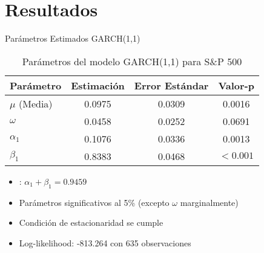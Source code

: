 \section{Resultados}

\begin{frame}{Parámetros Estimados GARCH(1,1)}
    \begin{table}
        \centering
        \begin{tabular}{lccc}
            \toprule
            \textbf{Parámetro} & \textbf{Estimación} & \textbf{Error Estándar} & \textbf{Valor-p} \\
            \midrule
            $\mu$ (Media) & 0.0975 & 0.0309 & 0.0016 \\
            $\omega$ & 0.0458 & 0.0252 & 0.0691 \\
            $\alpha_1$ & 0.1076 & 0.0336 & 0.0013 \\
            $\beta_1$ & 0.8383 & 0.0468 & $< 0.001$ \\
            \bottomrule
        \end{tabular}
        \caption{Parámetros del modelo GARCH(1,1) para S\&P 500}
    \end{table}
    
    \vspace{0.5em}
    
    \begin{itemize}
        \item<2-> : $\alpha_1 + \beta_1 = 0.9459$
        \item<3-> Parámetros significativos al 5\% (excepto $\omega$ marginalmente)
        \item<4-> Condición de estacionaridad se cumple
        \item<5-> Log-likelihood: -813.264 con 635 observaciones
    \end{itemize}
\end{frame}


